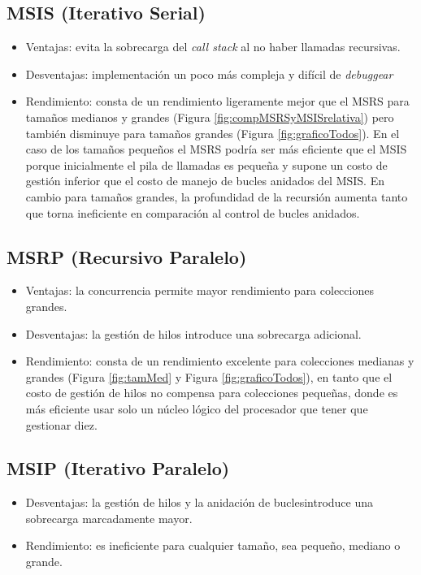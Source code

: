\documentclass[titlepage]{article}
\begin{document}
\subsection{MSIS (Iterativo Serial)} %
\begin{itemize}
	\item Ventajas: evita la sobrecarga del \textit{call stack} al no haber llamadas recursivas.
	\item Desventajas: implementación un poco más compleja y difícil de \textit{debuggear}
	\item Rendimiento: consta de un rendimiento ligeramente mejor que el MSRS para tamaños medianos y grandes (Figura \ref{fig:compMSRSyMSISrelativa}) pero también disminuye para tamaños grandes (Figura \ref{fig:graficoTodos}). En el caso de los tamaños pequeños el MSRS podría ser más eficiente que el MSIS porque inicialmente el pila de llamadas es pequeña y supone un costo de gestión inferior que el costo de manejo de bucles anidados del MSIS. En cambio para tamaños grandes, la profundidad de la recursión aumenta tanto que torna ineficiente en comparación al control de bucles anidados.
\end{itemize}

\subsection{MSRP (Recursivo Paralelo)}%
\begin{itemize}
	\item Ventajas: la concurrencia permite mayor rendimiento para colecciones grandes.
	\item Desventajas: la gestión de hilos introduce una sobrecarga adicional.
	\item Rendimiento: consta de un rendimiento excelente para colecciones medianas y grandes (Figura \ref{fig:tamMed} y Figura \ref{fig:graficoTodos}), en tanto que el costo de gestión de hilos no compensa para colecciones pequeñas, donde es más eficiente usar solo un núcleo lógico del procesador que tener que gestionar diez.
\end{itemize}
\subsection{MSIP (Iterativo Paralelo)}%
\begin{itemize}
	\item Desventajas: la gestión de hilos y la anidación de buclesintroduce una sobrecarga marcadamente mayor.
	\item Rendimiento: es ineficiente para cualquier tamaño, sea pequeño, mediano o grande.
\end{itemize}
\end{document}

